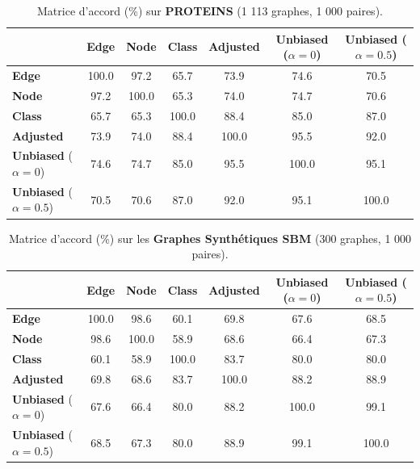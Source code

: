 \documentclass[11pt,a4paper]{article}
\begin{document}
\begin{table}[htbp]
\centering
\caption{Matrice d'accord (\%) sur \textbf{PROTEINS} (1 113 graphes, 1 000 paires).}
\label{tab:agreement_proteins}
\small
\begin{tabular}{lcccccc}
\toprule
& \textbf{Edge} & \textbf{Node} & \textbf{Class} & \textbf{Adjusted} & \textbf{Unbiased} ($\alpha=0$) & \textbf{Unbiased} ($\alpha=0.5$) \\
\midrule
\textbf{Edge}                  & 100.0 & 97.2  & 65.7  & 73.9  & 74.6  & 70.5  \\
\textbf{Node}                  & 97.2  & 100.0 & 65.3  & 74.0  & 74.7  & 70.6  \\
\textbf{Class}                 & 65.7  & 65.3  & 100.0 & 88.4  & 85.0  & 87.0  \\
\textbf{Adjusted}              & 73.9  & 74.0  & 88.4  & 100.0 & 95.5  & 92.0  \\
\textbf{Unbiased} ($\alpha=0$)   & 74.6  & 74.7  & 85.0  & 95.5  & 100.0 & 95.1  \\
\textbf{Unbiased} ($\alpha=0.5$) & 70.5  & 70.6  & 87.0  & 92.0  & 95.1  & 100.0 \\
\bottomrule
\end{tabular}
\end{table}

\begin{table}[htbp]
\centering
\caption{Matrice d'accord (\%) sur les \textbf{Graphes Synthétiques SBM} (300 graphes, 1 000 paires).}
\label{tab:agreement_synthetic}
\small
\begin{tabular}{lcccccc}
\toprule
& \textbf{Edge} & \textbf{Node} & \textbf{Class} & \textbf{Adjusted} & \textbf{Unbiased} ($\alpha=0$) & \textbf{Unbiased} ($\alpha=0.5$) \\
\midrule
\textbf{Edge}                  & 100.0 & 98.6  & 60.1  & 69.8  & 67.6  & 68.5  \\
\textbf{Node}                  & 98.6  & 100.0 & 58.9  & 68.6  & 66.4  & 67.3  \\
\textbf{Class}                 & 60.1  & 58.9  & 100.0 & 83.7  & 80.0  & 80.0  \\
\textbf{Adjusted}              & 69.8  & 68.6  & 83.7  & 100.0 & 88.2  & 88.9  \\
\textbf{Unbiased} ($\alpha=0$)   & 67.6  & 66.4  & 80.0  & 88.2  & 100.0 & 99.1  \\
\textbf{Unbiased} ($\alpha=0.5$) & 68.5  & 67.3  & 80.0  & 88.9  & 99.1  & 100.0 \\
\bottomrule
\end{tabular}
\end{table}
\end{document}
